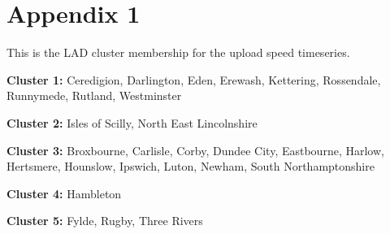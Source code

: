 \documentclass[]{interact}
\theoremstyle{plain}%
\theoremstyle{definition}
\theoremstyle{remark}
\begin{document}
\hypertarget{appendix1}{%
\section*{Appendix 1}\label{appendix1}}

This is the LAD cluster membership for the upload speed timeseries.

\textbf{Cluster 1: } Ceredigion, Darlington, Eden, Erewash, Kettering,
Rossendale, Runnymede, Rutland, Westminster

\textbf{Cluster 2: } Isles of Scilly, North East Lincolnshire

\textbf{Cluster 3: } Broxbourne, Carlisle, Corby, Dundee City,
Eastbourne, Harlow, Hertsmere, Hounslow, Ipswich, Luton, Newham, South
Northamptonshire

\textbf{Cluster 4: } Hambleton

\textbf{Cluster 5: } Fylde, Rugby, Three Rivers
\end{document}

